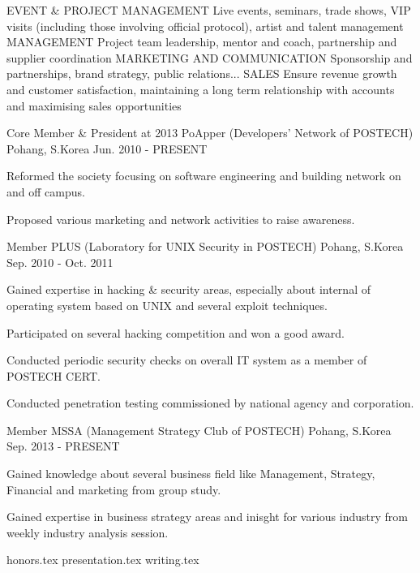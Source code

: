 \documentclass[11pt, a4paper]{awesome-cv}
\newcommand*{\sectiondir}{resume/}
\begin{document}
EVENT \& PROJECT MANAGEMENT
Live events, seminars, trade shows, VIP visits (including those involving official protocol), artist and talent management
MANAGEMENT
Project team leadership, mentor and coach, partnership and supplier coordination
MARKETING AND COMMUNICATION
Sponsorship and partnerships, brand strategy, public relations...
SALES
Ensure revenue growth and customer satisfaction, maintaining a long term relationship with accounts and maximising sales opportunities



\begin{cventries}
	\cventry
	{Core Member \& President at 2013}
	{PoApper (Developers' Network of POSTECH)}
	{Pohang, S.Korea}
	{Jun. 2010 - PRESENT}
	{
		\begin{cvitems}
			\item {Reformed the society focusing on software engineering and building network on and off campus.}
			\item {Proposed various marketing and network activities to raise awareness.}
		\end{cvitems}
	}
	\cventry
	{Member}
	{PLUS (Laboratory for UNIX Security in POSTECH)}
	{Pohang, S.Korea}
	{Sep. 2010 - Oct. 2011}
	{
		\begin{cvitems}
			\item {Gained expertise in hacking \& security areas, especially about internal of operating system based on UNIX and several exploit techniques.}
			\item {Participated on several hacking competition and won a good award.}
			\item {Conducted periodic security checks on overall IT system as a member of POSTECH CERT.}
			\item {Conducted penetration testing commissioned by national agency and corporation.}
		\end{cvitems}
	}
	\cventry
	{Member}
	{MSSA (Management Strategy Club of POSTECH)}
	{Pohang, S.Korea}
	{Sep. 2013 - PRESENT}
	{
		\begin{cvitems}
			\item {Gained knowledge about several business field like Management, Strategy, Financial and marketing from group study.}
			\item {Gained expertise in business strategy areas and inisght for various industry from weekly industry analysis session.}
		\end{cvitems}
	}
\end{cventries}



{honors.tex}
{presentation.tex}
{writing.tex}
\end{document}
